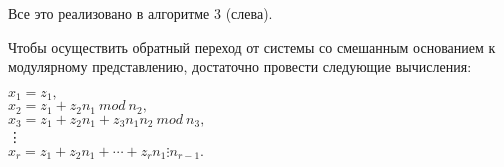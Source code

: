 \documentclass{mai_book}
\begin{document}
Все это реализовано в алгоритме 3 (слева). \par
Чтобы осуществить обратный переход от системы со смешанным
основанием к модулярному представлению, достаточно провести 
следующие вычисления:
\begin{flushleft}
\hspace{2cm}$x_{1} = z_{1},$ \\ 
\hspace{2cm}$x_{2} = z_{1} + z_{2}n_{1}\ mod\ n_{2},$ \\ 
\hspace{2cm}$x_{3} = z_{1} + z_{2}n_{1} + z_{3}n_{1}n_{2}\ mod\ n_{3},$ \\ 
\hspace{2.5cm} \vdots  \\
\hspace{2cm}$x_{r} = z_{1} + z_{2}n_{1} + \cdots + z_{r}n_{1} \vdots n_{r-1}.$
\end{flushleft}
\pagebreak
\newpage
\end{document}

